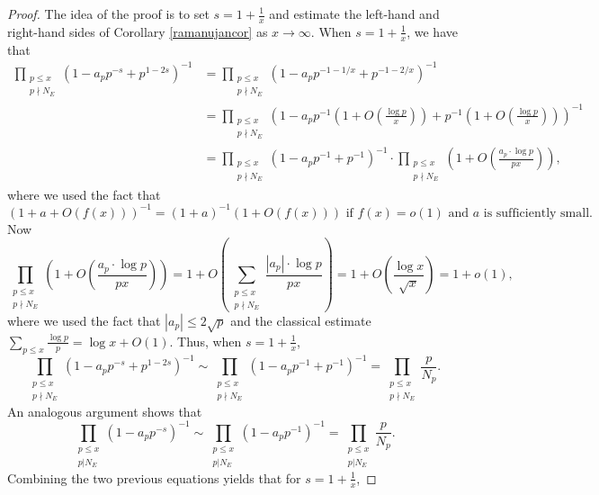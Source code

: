 \documentclass[12pt,reqno]{amsart}
\theoremstyle{definition}
\numberwithin{equation}{section}
\begin{document}
\begin{proof}
The idea of the proof is to set $s=1+\frac{1}{x}$ and estimate the left-hand and right-hand sides of Corollary \ref{ramanujancor} as $x \to \infty$.  When $s=1+\frac{1}{x}$, we have that
\begin{align*}
\prod_ {\substack{p \leq x \\ p \nmid N_E}} (1-a_pp^{-s}+p^{1-2s})^{-1} &= \prod_ {\substack{p \leq x \\ p \nmid N_E}} (1-a_pp^{-1-1/x}+p^{-1-2/x})^{-1} \\
&= \prod_ {\substack{p \leq x \\ p \nmid N_E}} \left (1-a_pp^{-1} \left (1+ O \left ( \frac{\log p}{x} \right ) \right)+p^{-1} \left (1+ O \left ( \frac{\log p}{x} \right ) \right) \right)^{-1}  \\
&= \prod_ {\substack{p \leq x \\ p \nmid N_E}} (1-a_pp^{-1}+p^{-1})^{-1} \cdot \prod_ {\substack{p \leq x \\ p \nmid N_E}} \left(1 + O \left ( \frac{a_p \cdot \log p }{p  x}  \right) \right), 
\end{align*}
where we used the fact that 
$$
(1+a+O(f(x)))^{-1}= (1+a)^{-1} (1+O(f(x))) \textrm{ if } f(x)=o(1) \textrm{ and } a  \textrm{ is sufficiently small.  } 
$$
Now 
$$
 \prod_ {\substack{p \leq x \\ p \nmid N_E}} \left(1 + O \left ( \frac{a_p \cdot \log p }{p  x}  \right) \right) = 1+O \left (  \sum_ {\substack{p \leq x \\ p \nmid N_E}} \frac{|a_p| \cdot \log p}{p x} \right ) = 1+O \left ( \frac{\log x}{\sqrt x} \right) =1+o(1), 
$$
where we used the fact that $|a_p| \leq 2 \sqrt p$ and the classical estimate $\sum_{p \leq x} \frac{\log p}{p}=\log x +O(1)$. 
Thus, when $s=1+\frac{1}{x}$, 
\begin{equation*} 
\prod_ {\substack{p \leq x \\ p \nmid N_E}} (1-a_pp^{-s}+p^{1-2s})^{-1} \sim \prod_ {\substack{p \leq x \\ p \nmid N_E}} (1-a_pp^{-1}+p^{-1})^{-1} = \prod_ {\substack{p \leq x \\ p \nmid N_E}} \frac{p}{N_p}. 
\end{equation*}
An analogous argument shows that 
\begin{equation*} 
\prod_ {\substack{p \leq x \\ p | N_E}} (1-a_pp^{-s})^{-1} \sim \prod_ {\substack{p \leq x \\ p | N_E}} (1-a_pp^{-1})^{-1} = \prod_ {\substack{p \leq x  \\ p | N_E}} \frac{p}{N_p}. 
\end{equation*}
Combining the two previous equations yields that for $s=1+\frac{1}{x}$, 


\end{proof}
\end{document}
